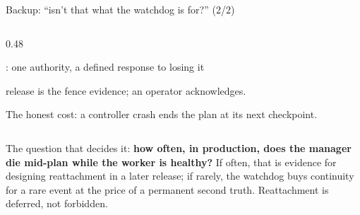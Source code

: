 \begin{frame}{Backup: ``isn't that what the watchdog is for?'' (2/2)}
\begin{columns}[T]
\begin{column}{0.48\textwidth}
\begin{block}{\vtwo{}: one authority, a defined response to losing it}
\begin{itemize}
                          release is the fence evidence; an operator acknowledges.
                \end{itemize}
                \vspace{0.1cm}
                The honest cost: a controller crash ends the plan at its next checkpoint.
            \end{block}
        \end{column}
    \end{columns}
    \vspace{0.05cm}
    {\footnotesize\color{qsgray} The question that decides it: \textbf{how often, in production, does the manager
    die mid-plan while the worker is healthy?} If often, that is evidence for designing reattachment in a later
    release; if rarely, the watchdog buys continuity for a rare event at the price of a permanent second truth.
    Reattachment is deferred, not forbidden.\par}
\end{frame}

